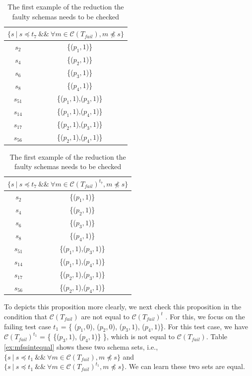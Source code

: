 \begin{table}[htbp]
  \centering
  \caption{The first example of the reduction the faulty schemas needs to be checked}
  \label{ex:mfssintequalfirst}
    \begin{tabular}{|c|c|} \hline
     \multicolumn{2}{|c|}{$\{ s\ |\ s \preceq t_{7}\ \&\&\ \forall m \in \mathcal{C}(T_{fail}),  m \npreceq s \}$} \\ \hline
   $s_{2}$ & \{($p_{1}, 1$)\} \\
   $s_{4}$ & \{($p_{2}, 1$)\} \\
   $s_{6}$ & \{($p_{3}, 1$)\} \\
   $s_{8}$ & \{($p_{4}, 1$)\} \\

   $s_{51}$ & \{($p_{1}, 1$),($p_{3}, 1$)\} \\
   $s_{14}$ & \{($p_{1}, 1$),($p_{4}, 1$)\} \\
   $s_{17}$ & \{($p_{2}, 1$),($p_{3}, 1$)\} \\
   $s_{56}$ & \{($p_{2}, 1$),($p_{4}, 1$)\} \\ \hline
    \end{tabular}%
\quad
    \begin{tabular}{|c|c|} \hline
   \multicolumn{2}{|c|}{$\{ s\ |\ s \preceq t_{7}\ \&\&\ \forall m \in \mathcal{C}(T_{fail})^{t_{7}},  m \npreceq s \}$}\\ \hline
   $s_{2}$ & \{($p_{1}, 1$)\} \\
   $s_{4}$ & \{($p_{2}, 1$)\} \\
   $s_{6}$ & \{($p_{3}, 1$)\} \\
   $s_{8}$ & \{($p_{4}, 1$)\} \\

   $s_{51}$ & \{($p_{1}, 1$),($p_{3}, 1$)\} \\
   $s_{14}$ & \{($p_{1}, 1$),($p_{4}, 1$)\} \\
   $s_{17}$ & \{($p_{2}, 1$),($p_{3}, 1$)\} \\
   $s_{56}$ & \{($p_{2}, 1$),($p_{4}, 1$)\} \\ \hline
    \end{tabular}%
\end{table}


To depicts this proposition more clearly, we next check this proposition in the condition that $\mathcal{C}(T_{fail})$ are not equal to $\mathcal{C}(T_{fail})^{t}$ . For this, we focus on the failing test case $t_{1}$ =  \{ ($p_{1}, 0$), ($p_{2}, 0$), ($p_{3}, 1$), ($p_{4}, 1$)\}. For this test case, we have $\mathcal{C}(T_{fail})^{t_{1}}$ = \{ \{($p_{3}, 1$), ($p_{4}, 1$)\} \}, which is not equal to $\mathcal{C}(T_{fail})$. Table \ref{ex:mfssintequal} shows these two schema sets, i.e., $\{ s\ |\  s \preceq t_{1}\ \&\&\ \forall m \in \mathcal{C}(T_{fail}),  m \npreceq s \}$ and $\{ s\ |\  s \preceq t_{1}\ \&\&\ \forall m \in \mathcal{C}(T_{fail})^{t_{1}},  m \npreceq s \}$. We can learn these two sets are equal.

